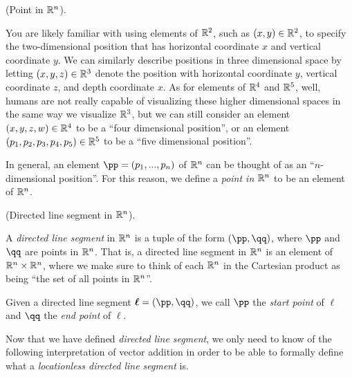 \begin{defn}
    (Point in $\mathbb{R}^n$).
    
    You are likely familiar with using elements of $\mathbb{R}^2$, such as $(x, y) \in \mathbb{R}^2$, to specify the two-dimensional position that has horizontal coordinate $x$ and vertical coordinate $y$. We can similarly describe positions in three dimensional space by letting $(x, y, z) \in \mathbb{R}^3$ denote the position with horizontal coordinate $y$, vertical coordinate $z$, and depth coordinate $x$. As for elements of $\mathbb{R}^4$ and $\mathbb{R}^5$, well, humans are not really capable of visualizing these higher dimensional spaces in the same way we visualize $\mathbb{R}^3$, but we can still consider an element $(x, y, z, w) \in \mathbb{R}^4$ to be a ``four dimensional position'', or an element $(p_1, p_2, p_3, p_4, p_5) \in \mathbb{R}^5$ to be a ``five dimensional position''.
    
   In general, an element $\pp = (p_1, ..., p_n)$ of $\mathbb{R}^n$ can be thought of as an ``$n$-dimensional position''. For this reason, we define a \textit{point in $\mathbb{R}^n$} to be an element of $\mathbb{R}^n$.
\end{defn}

\begin{defn}
    (Directed line segment in $\mathbb{R}^n$).
    
    A \textit{directed line segment} in $\mathbb{R}^n$ is a tuple of the form $(\pp, \qq)$, where $\pp$ and $\qq$ are points in $\mathbb{R}^n$. That is, a directed line segment in $\mathbb{R}^n$ is an element of $\mathbb{R}^n \times \mathbb{R}^n$, where we make sure to think of each $\mathbb{R}^n$ in the Cartesian product as being ``the set of all points in $\mathbb{R}^n$''.
    
    Given a directed line segment $\boldsymbol{\ell} = (\pp, \qq)$, we call $\pp$ the \textit{start point} of $\boldsymbol{\ell}$ and $\qq$ the \textit{end point} of $\boldsymbol{\ell}$.
\end{defn}

Now that we have defined \textit{directed line segment}, we only need to know of the following interpretation of vector addition in order to be able to formally define what a \textit{locationless directed line segment} is.

